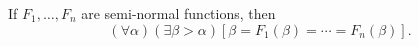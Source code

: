 If $F_1, \ldots, F_n$ are semi-normal functions, then
$$(\forall \alpha)(\exists \beta > \alpha)[\beta = F_1(\beta) = \cdots = F_n(\beta)].$$
